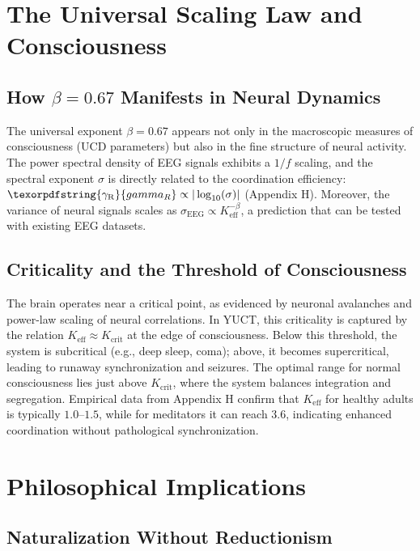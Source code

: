 \documentclass[12pt,a4paper]{article}
\DeclareRobustCommand{\gaR}{\texorpdfstring{\ensuremath{\gamma_{\mathrm{R}}}}{gamma_R}}
\newcommand{\eff}{\mathrm{eff}}
\newcommand{\Ke}{K_{\eff}}
\newcommand{\Kcrit}{K_{\mathrm{crit}}}
\begin{document}
	\section{The Universal Scaling Law and Consciousness}
	
	\subsection{How $\beta = 0.67$ Manifests in Neural Dynamics}
	
	The universal exponent $\beta = 0.67$ appears not only in the macroscopic measures of consciousness (UCD parameters) but also in the fine structure of neural activity. The power spectral density of EEG signals exhibits a $1/f$ scaling, and the spectral exponent $\sigma$ is directly related to the coordination efficiency: $\gaR \propto |\log_{10}(\sigma)|$ (Appendix H). Moreover, the variance of neural signals scales as $\sigma_{\text{EEG}} \propto \Ke^{-\beta}$, a prediction that can be tested with existing EEG datasets.
	
	\subsection{Criticality and the Threshold of Consciousness}
	
	The brain operates near a critical point, as evidenced by neuronal avalanches and power-law scaling of neural correlations. In YUCT, this criticality is captured by the relation $\Ke \approx \Kcrit$ at the edge of consciousness. Below this threshold, the system is subcritical (e.g., deep sleep, coma); above, it becomes supercritical, leading to runaway synchronization and seizures. The optimal range for normal consciousness lies just above $\Kcrit$, where the system balances integration and segregation. Empirical data from Appendix H confirm that $\Ke$ for healthy adults is typically $1.0$–$1.5$, while for meditators it can reach $3.6$, indicating enhanced coordination without pathological synchronization.
	
	\section{Philosophical Implications}
	
	\subsection{Naturalization Without Reductionism}
	
\end{document}
